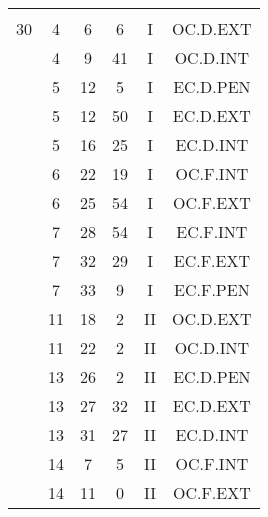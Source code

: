 \documentclass[12pt, a4paper]{article}
\begin{document}
\begin{multicols}{3}
{\begin{tabular}{c c c c c c}
	 	 	 	 & & & & & \\%
	 	 	 	30 & 4 & 6 & 6 & I & OC.D.EXT\\%
	 	 	 	 & 4 & 9 & 41 & I & OC.D.INT\\%
	 	 	 	 & 5 & 12 & 5 & I & EC.D.PEN\\%
	 	 	 	 & 5 & 12 & 50 & I & EC.D.EXT\\%
	 	 	 	 & 5 & 16 & 25 & I & EC.D.INT\\%
	 	 	 	 & 6 & 22 & 19 & I & OC.F.INT\\%
	 	 	 	 & 6 & 25 & 54 & I & OC.F.EXT\\%
	 	 	 	 & 7 & 28 & 54 & I & EC.F.INT\\%
	 	 	 	 & 7 & 32 & 29 & I & EC.F.EXT\\%
	 	 	 	 & 7 & 33 & 9 & I & EC.F.PEN\\%
	 	 	 	 & 11 & 18 & 2 & II & OC.D.EXT\\%
	 	 	 	 & 11 & 22 & 2 & II & OC.D.INT\\%
	 	 	 	 & 13 & 26 & 2 & II & EC.D.PEN\\%
	 	 	 	 & 13 & 27 & 32 & II & EC.D.EXT\\%
	 	 	 	 & 13 & 31 & 27 & II & EC.D.INT\\%
	 	 	 	 & 14 & 7 & 5 & II & OC.F.INT\\%
	 	 	 	 & 14 & 11 & 0 & II & OC.F.EXT\\%
	 	 \end{tabular}
 	}
\end{multicols}
\end{document}
